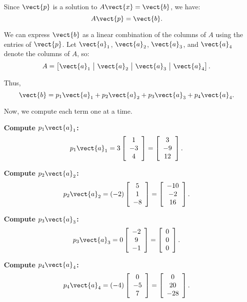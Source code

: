 \begin{solution} Since $\vect{p}$ is a solution to $A \vect{x} = \vect{b}$, we have:
    \[
    A \vect{p} = \vect{b}.
    \]
    
    We can express $\vect{b}$ as a linear combination of the columns of $A$ using the entries of $\vect{p}$. Let $\vect{a}_1$, $\vect{a}_2$, $\vect{a}_3$, and $\vect{a}_4$ denote the columns of $A$, so:
    \[
    A = \left[ \vect{a}_1 \ \big| \ \vect{a}_2 \ \big| \ \vect{a}_3 \ \big| \ \vect{a}_4 \right].
    \]
    
    Thus,
    \[
    \vect{b} = p_1 \vect{a}_1 + p_2 \vect{a}_2 + p_3 \vect{a}_3 + p_4 \vect{a}_4.
    \]
    
    Now, we compute each term one at a time.
    
    \textbf{Compute $p_1 \vect{a}_1$:}
    \[
    p_1 \vect{a}_1 = 3 \left[\begin{array}{c}
    1 \\
    -3 \\
    4
    \end{array}\right] = \left[\begin{array}{c}
    3 \\
    -9 \\
    12
    \end{array}\right].
    \]
    
    \textbf{Compute $p_2 \vect{a}_2$:}
    \[
    p_2 \vect{a}_2 = (-2) \left[\begin{array}{c}
    5 \\
    1 \\
    -8
    \end{array}\right] = \left[\begin{array}{c}
    -10 \\
    -2 \\
    16
    \end{array}\right].
    \]
    
    \textbf{Compute $p_3 \vect{a}_3$:}
    \[
    p_3 \vect{a}_3 = 0 \left[\begin{array}{c}
    -2 \\
    9 \\
    -1
    \end{array}\right] = \left[\begin{array}{c}
    0 \\
    0 \\
    0
    \end{array}\right].
    \]
    
    \textbf{Compute $p_4 \vect{a}_4$:}
    \[
    p_4 \vect{a}_4 = (-4) \left[\begin{array}{c}
    0 \\
    -5 \\
    7
    \end{array}\right] = \left[\begin{array}{c}
    0 \\
    20 \\
    -28
    \end{array}\right].
    \]
    

\end{solution}
